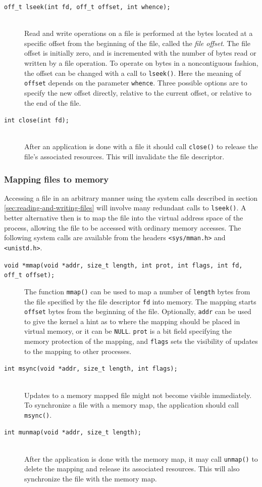 \begin{description}
\item[\texttt{off\_t lseek(int fd, off\_t offset, int whence);}] \hfill \\
Read and write operations on a file is performed at the bytes located at a specific offset from the beginning of the file, called the \emph{file offset}. The file offset is initially zero, and is incremented with the number of bytes read or written by a file operation. To operate on bytes in a noncontiguous fashion, the offset can be changed with a call to \texttt{lseek()}. Here the meaning of \texttt{offset} depends on the parameter \texttt{whence}. Three possible options are to specify the new offset directly, relative to the current offset, or relative to the end of the file.
\item[\texttt{int close(int fd);}] \hfill \\
After an application is done with a file it should call \texttt{close()} to release the file's associated resources. This will invalidate the file descriptor.
\end{description}

\subsubsection{Mapping files to memory}\label{mapping-files-to-memory}
Accessing a file in an arbitrary manner using the system calls described in section \ref{sec:reading-and-writing-files} will involve many redundant calls to \texttt{lseek()}. A better alternative then is to map the file into the virtual address space of the process, allowing the file to be accessed with ordinary memory accesses. The following system calls are available from the headers \texttt{<sys/mman.h>} and \texttt{<unistd.h>}.
\cite{linux-man-pages}

\begin{description}
\item[\texttt{void *mmap(void *addr, size\_t length, int prot, int flags, int fd, off\_t offset);}]
The function \texttt{mmap()} can be used to map a number of \texttt{length} bytes from the file specified by the file descriptor \texttt{fd} into memory. The mapping starts \texttt{offset} bytes from the beginning of the file. Optionally, \texttt{addr} can be used to give the kernel a hint as to where the mapping should be placed in virtual memory, or it can be \texttt{NULL}. \texttt{prot} is a bit field specifying the memory protection of the mapping, and \texttt{flags} sets the visibility of updates to the mapping to other processes.
\item[\texttt{int msync(void *addr, size\_t length, int flags);}] \hfill \\
Updates to a memory mapped file might not become visible immediately. To synchronize a file with a memory map, the application should call \texttt{msync()}.
\item[\texttt{int munmap(void *addr, size\_t length);}] \hfill \\
After the application is done with the memory map, it may call \texttt{unmap()} to delete the mapping and release its associated resources. This will also synchronize the file with the memory map.
\end{description}


